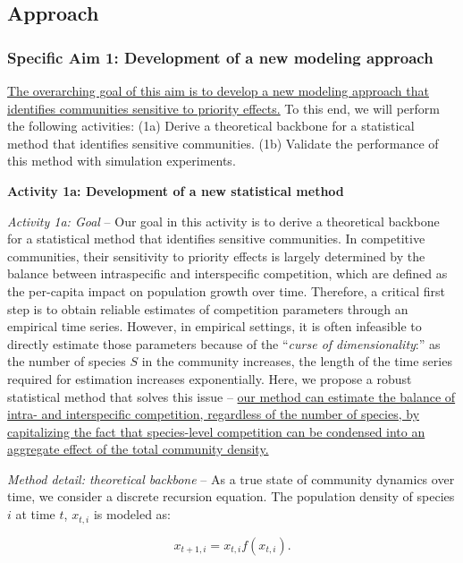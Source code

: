 \documentclass[12pt, class=article, crop=false]{standalone}
\begin{document}
\subsection*{Approach}

\subsubsection*{Specific Aim 1: Development of a new modeling approach}

\ul{The overarching goal of this aim is to develop a new modeling approach that identifies communities sensitive to priority effects.}
To this end, we will perform the following activities:
(1a) Derive a theoretical backbone for a statistical method that identifies sensitive communities.
(1b) Validate the performance of this method with simulation experiments.

\textbf{Activity 1a: Development of a new statistical method}

\textit{Activity 1a: Goal} -- 
Our goal in this activity is to derive a theoretical backbone for a statistical method that identifies sensitive communities.
In competitive communities, their sensitivity to priority effects is largely determined by the balance between intraspecific and interspecific competition, which are defined as the per-capita impact on population growth over time.
Therefore, a critical first step is to obtain reliable estimates of competition parameters through an empirical time series.
However, in empirical settings, it is often infeasible to directly estimate those parameters because of the ``\textit{curse of dimensionality}:'' as the number of species $S$ in the community increases, the length of the time series required for estimation increases exponentially.
Here, we propose a robust statistical method that solves this issue -- \ul{our method can estimate the balance of intra- and interspecific competition, regardless of the number of species, by capitalizing the fact that species-level competition can be condensed into an aggregate effect of the total community density.}

\textit{Method detail: theoretical backbone} -- 
As a true state of community dynamics over time, we consider a discrete recursion equation. The population density of species $i$ at time $t$, $x_{t,i}$ is modeled as:

\begin{equation}
\label{eq:m0}
x_{t + 1, i} = x_{t, i} f(x_{t, i}).
\end{equation}
\end{document}
